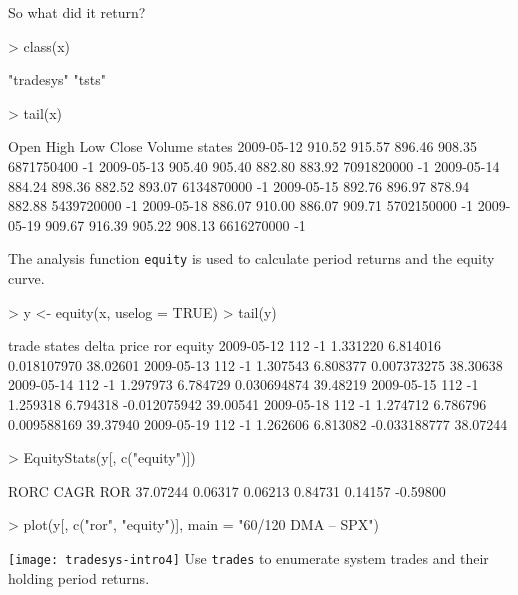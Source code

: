 \documentclass[a4]{article}
\newcommand{\code}[1]{\texttt{#1}}
\begin{document}
So what did it return?
\begin{Schunk}
\begin{Sinput}
> class(x)
\end{Sinput}
\begin{Soutput}
[1] "tradesys" "tsts"    
\end{Soutput}
\begin{Sinput}
> tail(x)
\end{Sinput}
\begin{Soutput}
             Open   High    Low  Close     Volume states
2009-05-12 910.52 915.57 896.46 908.35 6871750400     -1
2009-05-13 905.40 905.40 882.80 883.92 7091820000     -1
2009-05-14 884.24 898.36 882.52 893.07 6134870000     -1
2009-05-15 892.76 896.97 878.94 882.88 5439720000     -1
2009-05-18 886.07 910.00 886.07 909.71 5702150000     -1
2009-05-19 909.67 916.39 905.22 908.13 6616270000     -1
\end{Soutput}
\end{Schunk}
The analysis function \code{equity} is used to calculate period
returns and the equity curve.
\begin{Schunk}
\begin{Sinput}
> y <- equity(x, uselog = TRUE)
> tail(y)
\end{Sinput}
\begin{Soutput}
           trade states    delta    price          ror   equity
2009-05-12   112     -1 1.331220 6.814016  0.018107970 38.02601
2009-05-13   112     -1 1.307543 6.808377  0.007373275 38.30638
2009-05-14   112     -1 1.297973 6.784729  0.030694874 39.48219
2009-05-15   112     -1 1.259318 6.794318 -0.012075942 39.00541
2009-05-18   112     -1 1.274712 6.786796  0.009588169 39.37940
2009-05-19   112     -1 1.262606 6.813082 -0.033188777 38.07244
\end{Soutput}
\begin{Sinput}
> EquityStats(y[, c("equity")])
\end{Sinput}
\begin{Soutput}
    RORC     CAGR     ROR%       R2     VOLA    MAXDD 
37.07244  0.06317  0.06213  0.84731  0.14157 -0.59800 
\end{Soutput}
\begin{Sinput}
> plot(y[, c("ror", "equity")], main = "60/120 DMA -- SPX")
\end{Sinput}
\end{Schunk}
\texttt{[image: tradesys-intro4]}
Use \code{trades} to enumerate system trades and their holding
period returns.
\end{document}
